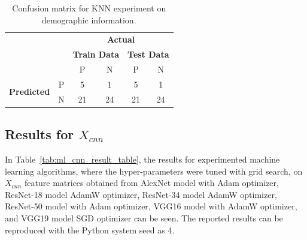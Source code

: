 \begin{table}[!h]
\centering
\caption{Confusion matrix for KNN experiment on demographic information.}
\label{tab:knn_conf_matrix_xinfo}
\begin{tabular}{|cc|c|c|c|c|}
\cline{1-6}
                                                          &   & \multicolumn{4}{c|}{\textbf{Actual}}                                                                                                                                                                                       \\ \cline{3-6} 
                                                          &   & \multicolumn{2}{c|}{\textbf{Train Data}} & \multicolumn{2}{c|}{\textbf{Test Data}} \\ \cline{3-6} 
                                                          &   & \text{\:\:} P \text{\:\:}                                                   & N                                                    & \text{\:} P \text{\:}                                                   & N                                                   \\ \hline
\multicolumn{1}{|c|}{\multirow{2}{*}{\textbf{Predicted}}} & P & 5                                                     & 1                                                    & 5                                                     & 1                                                   \\ \cline{2-6} 
\multicolumn{1}{|c|}{}                                    & N & 21                                                    & 24                                                   & 21                                                    & 24                                                  \\ \hline
\end{tabular}
\end{table}

\subsection{Results for $X_{cnn}$} \label{CH6:results_xcnn}

In Table~\ref{tab:ml_cnn_result_table}, the results for experimented machine learning algorithms, where the hyper-parameters were tuned with grid search, on $X_{cnn}$ feature matrices obtained from AlexNet model with Adam optimizer, ResNet-18 model AdamW optimizer, ResNet-34 model AdamW optimizer, ResNet-50 model with Adam optimizer, VGG16 model with AdamW optimizer, and VGG19 model SGD optimizer can be seen. The reported results can be reproduced with the Python system seed as 4.

